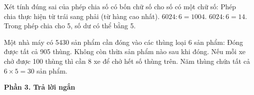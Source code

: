\begin{ex} %
Xét tính đúng sai của phép chia số có bốn chữ số cho số có một chữ số:
\choiceTF
{\True Phép chia thực hiện từ trái sang phải (từ hàng cao nhất).}
{\True $6024 : 6 = 1004$.}
{$6024 : 6 = 14$.}
{Trong phép chia cho 5, số dư có thể bằng 5.}
\end{ex}

\begin{ex} %
Một nhà máy có 5430 sản phẩm cần đóng vào các thùng loại 6 sản phẩm:
\choiceTF
{\True Đóng được tất cả 905 thùng.}
{\True Không còn thừa sản phẩm nào sau khi đóng.}
{Nếu mỗi xe chở được 100 thùng thì cần 8 xe để chở hết số thùng trên.}
{\True Năm thùng chứa tất cả $6 \times 5 = 30$ sản phẩm.}
\end{ex}

\textbf{Phần 3. Trả lời ngắn}

